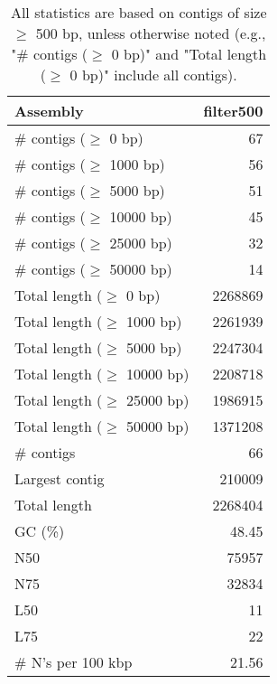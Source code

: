 \documentclass[12pt,a4paper]{article}
\begin{document}
\begin{table}[ht]
\begin{center}
\caption{All statistics are based on contigs of size $\geq$ 500 bp, unless otherwise noted (e.g., "\# contigs ($\geq$ 0 bp)" and "Total length ($\geq$ 0 bp)" include all contigs).}
\begin{tabular}{|l*{1}{|r}|}
\hline
Assembly & filter500 \\ \hline
\# contigs ($\geq$ 0 bp) & 67 \\ \hline
\# contigs ($\geq$ 1000 bp) & 56 \\ \hline
\# contigs ($\geq$ 5000 bp) & 51 \\ \hline
\# contigs ($\geq$ 10000 bp) & 45 \\ \hline
\# contigs ($\geq$ 25000 bp) & 32 \\ \hline
\# contigs ($\geq$ 50000 bp) & 14 \\ \hline
Total length ($\geq$ 0 bp) & 2268869 \\ \hline
Total length ($\geq$ 1000 bp) & 2261939 \\ \hline
Total length ($\geq$ 5000 bp) & 2247304 \\ \hline
Total length ($\geq$ 10000 bp) & 2208718 \\ \hline
Total length ($\geq$ 25000 bp) & 1986915 \\ \hline
Total length ($\geq$ 50000 bp) & 1371208 \\ \hline
\# contigs & 66 \\ \hline
Largest contig & 210009 \\ \hline
Total length & 2268404 \\ \hline
GC (\%) & 48.45 \\ \hline
N50 & 75957 \\ \hline
N75 & 32834 \\ \hline
L50 & 11 \\ \hline
L75 & 22 \\ \hline
\# N's per 100 kbp & 21.56 \\ \hline
\end{tabular}
\end{center}
\end{table}
\end{document}

